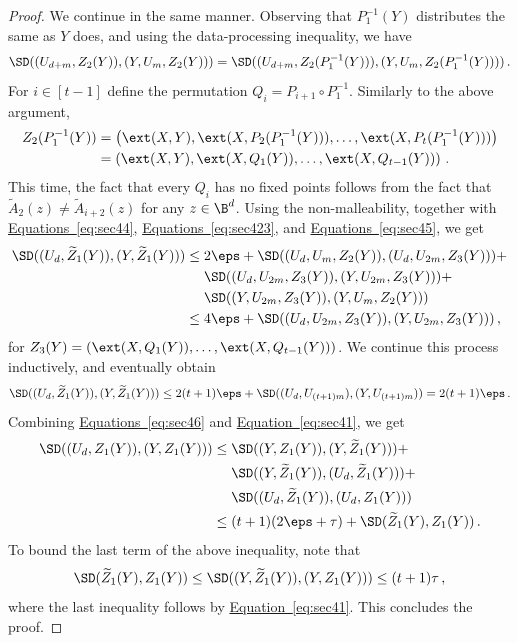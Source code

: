 \documentclass[11pt]{article}
\numberwithin{equation}{section}
\theoremstyle{definition}
\theoremstyle{plain}
\newcommand{\expeqref}[2]{\hyperref[#2]{#1~\eqref{#2}}}
\begin{document}
\begin{proof}
We continue in the same manner. Observing that $P_{1}^{-1}(Y)$ distributes the same as $Y$
does, and using the data-processing inequality, we have
\begin{equation}\label{eq:sec45}
\SD((U_{d+m},Z_{2}(Y)),(Y,U_m,Z_{2}(Y))) = 
\SD((U_{d+m},Z_{2}(P_{1}^{-1}(Y))),(Y,U_m,Z_{2}(P_{1}^{-1}(Y))))\,.
\end{equation}
For $i \in [t-1]$ define the permutation $Q_i = P_{i+1} \circ P_1^{-1}$.
Similarly to the above argument,
\begin{align*}
Z_{2}(P_{1}^{-1}(Y)) &= \left( \ext(X,Y),\ext(X,P_{2}(P_{1}^{-1}(Y))),\ldots,\ext(X,P_{t}(P_{1}^{-1}(Y))) \right) \\
&= \left( \ext(X,Y),\ext(X,Q_{1}(Y)),\ldots,\ext(X,Q_{t-1}(Y)) \right)\,.
\end{align*}
This time, the fact that every $Q_i$ has no
fixed points follows from the fact that $\widetilde{A}_{2}(z) \neq \widetilde{A}_{i+2}(z)$ for
any $z \in \B^{d}$. Using the non-malleability, together with
\expeqref{Equations}{eq:sec44}, \expeqref{Equations}{eq:sec423},
and \expeqref{Equations}{eq:sec45}, we get 
\begin{align*}
\SD((U_d,\widetilde{Z}_1(Y)),(Y,\widetilde{Z}_1(Y))) &\le 2\eps + \SD((U_{d},U_{m},Z_{2}(Y)),(U_{d},U_{2m},Z_{3}(Y))) + \\
&~~~~ \SD((U_d,U_{2m},Z_{3}(Y)),(Y,U_{2m},Z_{3}(Y))) + \\
&~~~~ \SD((Y,U_{2m},Z_{3}(Y)),(Y,U_{m},Z_{2}(Y))) \\
&\le 4\eps + \SD((U_d,U_{2m},Z_{3}(Y)),(Y,U_{2m},Z_{3}(Y)))\,,
\end{align*}
for $Z_{3}(Y) = \left( \ext(X,Q_{1}(Y)),\ldots,\ext(X,Q_{t-1}(Y)) \right)$. We continue
this process inductively, and eventually obtain
\begin{equation}\label{eq:sec46}
\SD((U_d,\widetilde{Z}_1(Y)),(Y,\widetilde{Z}_1(Y))) \le 2(t+1)\eps + \SD((U_d,U_{(t+1)m}),(Y,U_{(t+1)m})) = 2(t+1)\eps\,.
\end{equation}
Combining \expeqref{Equations}{eq:sec46} and 
\expeqref{Equation}{eq:sec41}, we get
\begin{align*}
\SD((U_d,Z_1(Y)),(Y,Z_1(Y))) &\le \SD((Y,Z_1(Y)),(Y,\widetilde{Z}_{1}(Y))) + \\ &~~~~\SD((Y,\widetilde{Z}_1(Y)),(U_d,\widetilde{Z}_1(Y))) + \\
&~~~~\SD((U_d,\widetilde{Z}_1(Y)),(U_d,Z_{1}(Y))) \\
&\le (t+1)(2\eps+\tau) + \SD(\widetilde{Z}_1(Y),Z_{1}(Y))\,.
\end{align*}
To bound the last term of the above inequality, note that
\[
\SD(\widetilde{Z}_1(Y),Z_{1}(Y)) \le \SD((Y,\widetilde{Z}_1(Y)),(Y,Z_{1}(Y))) \le (t+1)\tau\,,
\]
where the last inequality follows by \expeqref{Equation}{eq:sec41}. This concludes the proof.
\end{proof}
\end{document}
